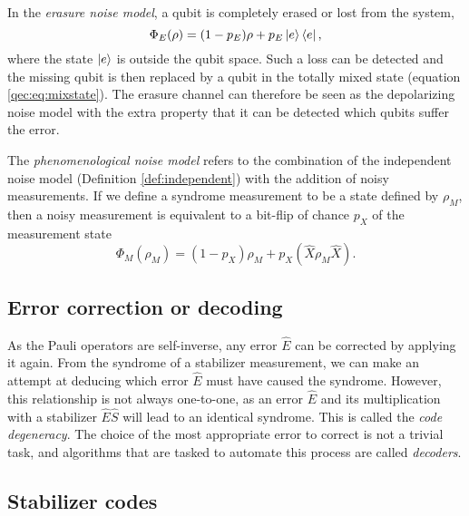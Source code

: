 \begin{definition}\label{def:erasurenoise}
  In the \emph{erasure noise model}, a qubit is completely erased or lost from the system,
  \begin{equation}\label{qec:eq:erasure}
    \Phi_E(\rho) = (1-p_E)\rho + p_E\ket{e}\bra{e},
  \end{equation}
  where the state $\ket{e}$ is outside the qubit space. Such a loss can be detected and the missing qubit is then replaced by a qubit in the totally mixed state (equation \eqref{qec:eq:mixstate}). The erasure channel can therefore be seen as the depolarizing noise model with the extra property that it can be detected which qubits suffer the error.
\end{definition}

\begin{definition}\label{def:pheno}
  The \emph{phenomenological noise model} refers to the combination of the independent noise model (Definition \ref{def:independent}) with the addition of noisy measurements. If we define a syndrome measurement to be a state defined by $\rho_M$, then a noisy measurement is equivalent to a bit-flip of chance $p_X$ of the measurement state
  \begin{equation}\label{eq:pheno}
    \Phi_M(\rho_M)=  (1-p_X)\rho_M + p_X(\hat{X}\rho_M \hat{X}).
  \end{equation}
\end{definition}


\subsection{Error correction or decoding}

As the Pauli operators are self-inverse, any error $\hat{E}$ can be corrected by applying it again. From the syndrome of a stabilizer measurement, we can make an attempt at deducing which error $\hat{E}$ must have caused the syndrome. However, this relationship is not always one-to-one, as an error $\hat{E}$ and its multiplication with a stabilizer $\hat{E}\hat{S}$ will lead to an identical syndrome. This is called the \emph{code degeneracy}. The choice of the most appropriate error to correct is not a trivial task, and algorithms that are tasked to automate this process are called \emph{decoders}.

\subsection{Stabilizer codes}

